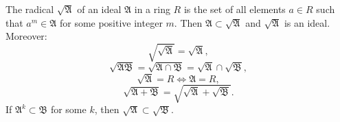 The radical $\sqrt{\mathfrak{A}}$ of an ideal $\mathfrak{A}$ in a ring $R$ is the set of all elements $a \in R$ such that $a^m \in \mathfrak{A}$ for some positive integer $m$. Then $\mathfrak{A} \subset \sqrt{\mathfrak{A}}$ and $\sqrt{\mathfrak{A}}$ is an ideal. Moreover:
$$\sqrt{\sqrt{\mathfrak{A}}} = \sqrt{\mathfrak{A}},$$
$$\sqrt{\mathfrak{A}\mathfrak{B}} = \sqrt{\mathfrak{A} \cap \mathfrak{B}} = \sqrt{\mathfrak{A}} \cap \sqrt{\mathfrak{B}},$$
$$\sqrt{\mathfrak{A}} = R \iff \mathfrak{A} = R,$$
$$\sqrt{\mathfrak{A} + \mathfrak{B}} = \sqrt{\sqrt{\mathfrak{A}} + \sqrt{\mathfrak{B}}}.$$
If $\mathfrak{A}^k \subset \mathfrak{B}$ for some $k$, then $\sqrt{\mathfrak{A}} \subset \sqrt{\mathfrak{B}}$.
